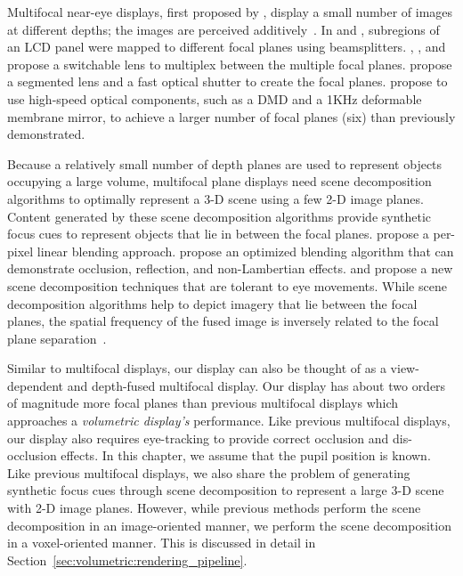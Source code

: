 Multifocal near-eye displays, first proposed by \citet{Akeley2004}, display a small number of images at different depths; the images are perceived additively~\cite{Akeley2004,MacKenzie2010Accommodation,Liu2010novel,Love2009high,Hu2015Design}. In \citet{Akeley2004} and \citet{MacKenzie2010Accommodation}, subregions of an LCD panel were mapped to different focal planes using beamsplitters. \citet{liu2009time}, \citet{Love2009high}, and \citet{Liu2010novel} propose a switchable lens to multiplex between the multiple focal planes. \citet{wang2018digitally} propose a segmented lens and a fast optical shutter to create the focal planes.  \citet{Hu2014design,Hu2014High,Hu2015Design} propose to use high-speed optical components, such as a DMD and a 1KHz deformable membrane mirror, to achieve a larger number of focal planes (six) than previously demonstrated. 

Because a relatively small number of depth planes are used to represent objects occupying a large volume, multifocal plane displays need scene decomposition algorithms to optimally represent a 3-D scene using a few 2-D image planes. Content generated by these scene decomposition algorithms provide synthetic focus cues to represent objects that lie in between the focal planes. \citet{MacKenzie2010Accommodation} propose a per-pixel linear blending approach. \citet{Narain2015optimal} propose an optimized blending algorithm that can demonstrate occlusion, reflection, and non-Lambertian effects. \citet{Mercier2017Fast} and \citet{Lee2017foveated} propose a new scene decomposition techniques that are tolerant to eye movements. While scene decomposition algorithms help to depict imagery that lie between the focal planes, the spatial frequency of the fused image is inversely related to the focal plane separation~\cite{Hu2014design, Hua2017Enabling}. 

Similar to multifocal displays, our display can also be thought of as a view-dependent and depth-fused multifocal display. Our display has about two orders of magnitude more focal planes than previous multifocal displays which approaches a \emph{volumetric display's} performance. Like previous multifocal displays, our display also requires eye-tracking to provide correct occlusion and dis-occlusion effects. In this chapter, we assume that the pupil position is known. Like previous multifocal displays, we also share the problem of generating synthetic focus cues through scene decomposition to represent a large 3-D scene with 2-D image planes. However, while previous methods perform the scene decomposition in an image-oriented manner, we perform the scene decomposition in a voxel-oriented manner. This is discussed in detail in Section~\ref{sec:volumetric:rendering_pipeline}. 

